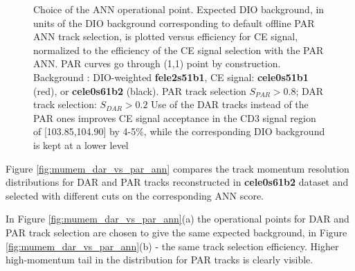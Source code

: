 \begin{figure}[H]
\caption{
  \label{fig:mumem_ann_operational_point_choice}
  Choice of the ANN operational point. Expected DIO background, in units of the DIO background corresponding to 
  default offline PAR ANN track selection, is plotted versus efficiency for CE signal, normalized to the efficiency
  of the CE signal selection with the PAR ANN. PAR curves go through (1,1) point by construction.
  Background : DIO-weighted {\bf fele2s51b1}, CE signal: {\bf cele0s51b1} (red), or {\bf cele0s61b2} (black).
  PAR track selection $S_{PAR} > 0.8$;  DAR track selection: $S_{DAR} > 0.2$ 
  Use of the DAR tracks instead of the PAR ones improves CE signal acceptance in the CD3 signal region of [103.85,104.90]
  by 4-5\%, while the corresponding DIO background is kept at a lower level
}
\end{figure}

Figure \ref{fig:mumem_dar_vs_par_ann} compares the track momentum resolution distributions 
for DAR and PAR tracks reconstructed in {\bf cele0s61b2} dataset and selected with different
cuts on the corresponding ANN score.

In Figure \ref{fig:mumem_dar_vs_par_ann}(a) the operational points for DAR and PAR track selection
are chosen to give the same expected background, in Figure \ref{fig:mumem_dar_vs_par_ann}(b) -
the same track selection efficiency. Higher high-momentum tail in the distribution for PAR
tracks is clearly visible.

